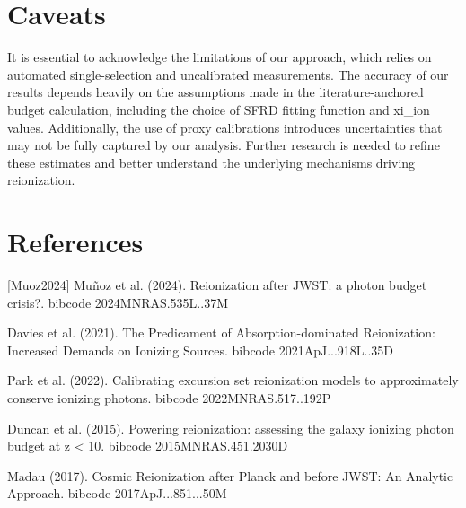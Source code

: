 \documentclass[twocolumn]{aastex631}
\begin{document}
\section{Caveats}
It is essential to acknowledge the limitations of our approach, which relies on automated single-selection and uncalibrated measurements. The accuracy of our results depends heavily on the assumptions made in the literature-anchored budget calculation, including the choice of SFRD fitting function and xi\_ion values. Additionally, the use of proxy calibrations introduces uncertainties that may not be fully captured by our analysis. Further research is needed to refine these estimates and better understand the underlying mechanisms driving reionization.
\section*{References}
\footnotesize
[Muoz2024] Muñoz et al. (2024). Reionization after JWST: a photon budget crisis?. bibcode 2024MNRAS.535L..37M \par [Davies2021] Davies et al. (2021). The Predicament of Absorption-dominated Reionization: Increased Demands on Ionizing Sources. bibcode 2021ApJ...918L..35D \par [Park2022] Park et al. (2022). Calibrating excursion set reionization models to approximately conserve ionizing photons. bibcode 2022MNRAS.517..192P \par [Duncan2015] Duncan et al. (2015). Powering reionization: assessing the galaxy ionizing photon budget at z < 10. bibcode 2015MNRAS.451.2030D \par [Madau2017] Madau (2017). Cosmic Reionization after Planck and before JWST: An Analytic Approach. bibcode 2017ApJ...851...50M
\end{document}
